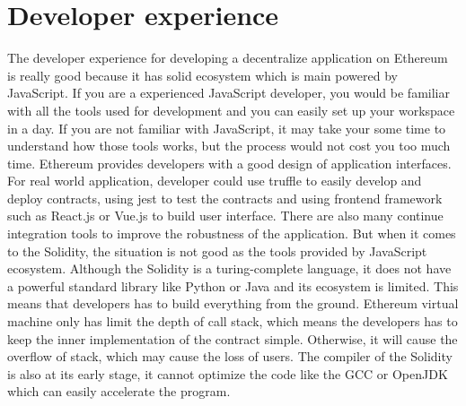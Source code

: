 \documentclass[openany,12pt]{ecsthesis}      %
\begin{document}
\section{Developer experience}
The developer experience for developing a decentralize application on Ethereum is really good because it has solid ecosystem which is main powered by JavaScript. 
If you are a experienced JavaScript developer, 
you would be familiar with all the tools used for development and you can easily set up your workspace in a day.
If you are not familiar with JavaScript, it may take your some time to understand how those tools works, 
but the process would not cost you too much time. 
Ethereum provides developers with a good design of application interfaces. For real world application,
developer could use truffle \cite{truffle} to easily develop and deploy contracts, using jest \cite{jest} to test the contracts and using frontend framework such as React.js or Vue.js to build user interface.
There are also many continue integration tools to improve the robustness of the application.
But when it comes to the Solidity, the situation is not good as the tools provided by JavaScript ecosystem. Although the Solidity is a turing-complete language, 
it does not have a powerful standard library like Python or Java and its ecosystem is limited.
This means that developers has to build everything from the ground. Ethereum virtual machine only has limit the depth of call stack, 
which means the developers has to keep the inner implementation of the contract simple. Otherwise, it will cause the overflow of stack, 
which may cause the loss of users. The compiler of the Solidity is also at its early stage, 
it cannot optimize the code like the GCC or OpenJDK which can easily accelerate the program.
\end{document}
